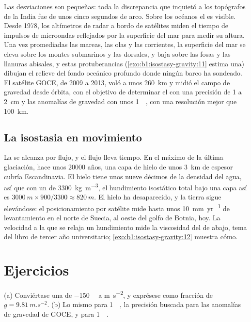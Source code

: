 Las desviaciones son pequeñas: toda la discrepancia que inquietó a los topógrafos de la India fue de unos cinco segundos de arco.
Sobre los océanos el  es visible. Desde 1978, los altímetros de radar a bordo de satélites miden el tiempo de impulsos de
microondas reflejados por la superficie del mar para medir su altura. Una vez promediadas las mareas, las olas y las corrientes, la
superficie del mar se eleva sobre los montes submarinos y las dorsales, y baja sobre las fosas y las llanuras abisales, y estas
protuberancias (\cref{exo:b1:isostasy-gravity:11} estima una) dibujan el relieve del fondo oceánico profundo donde ningún barco ha
sondeado. El satélite GOCE, de 2009 a 2013, voló a unos \qty{260}{km} y midió el campo de gravedad desde órbita, con el objetivo de
determinar el  con una precisión de 1 a \qty{2}{cm} y las anomalías de gravedad con unos \qty{1}{\milli\gal}, con una resolución
mejor que \qty{100}{km}.

\subsection*{La isostasia en movimiento}

La  se alcanza por flujo, y el flujo lleva tiempo. En el máximo de la última glaciación, hace unos \num{20000} años, una capa
de hielo de unos \qty{3}{km} de espesor cubría Escandinavia. El hielo tiene unos nueve décimos de la densidad del agua, así que con
un  de \qty{3300}{kg.m^{-3}}, el hundimiento isostático total bajo una capa así es $\qty{3000}{m}\times900/3300 \approx \qty{820}{m}$. El hielo ha desaparecido, y la tierra sigue elevándose: el posicionamiento por satélite mide hasta unos
\qty{10}{mm.yr^{-1}} de levantamiento en el norte de Suecia, al oeste del golfo de Botnia, hoy. La velocidad a la que se relaja un
hundimiento mide la viscosidad del  de abajo, tema del libro de tercer año universitario; \cref{exo:b1:isostasy-gravity:12}
muestra cómo.

\section{Ejercicios}

\begin{exercise}[$\star$]\label{exo:b1:isostasy-gravity:1}
(a) Conviértase una  de \qty{-150}{\milli\gal} a \unit{m.s^{-2}}, y exprésese como fracción de
$g = \qty{9.81}{m.s^{-2}}$. (b) Lo mismo para \qty{1}{\milli\gal}, la precisión buscada para las anomalías de gravedad de GOCE,
y para \qty{1}{\micro\gal}.
\end{exercise}

